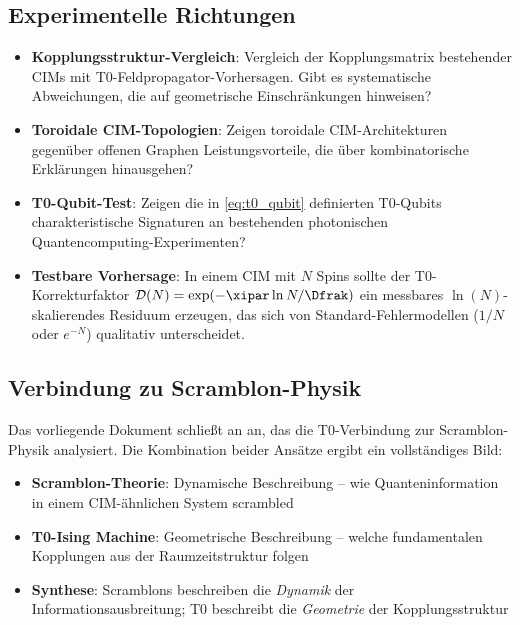\subsection{Experimentelle Richtungen}

\begin{itemize}
    \item \textbf{Kopplungsstruktur-Vergleich}: Vergleich der Kopplungsmatrix 
    bestehender CIMs mit T0-Feldpropagator-Vorhersagen. Gibt es systematische 
    Abweichungen, die auf geometrische Einschränkungen hinweisen?
    
    \item \textbf{Toroidale CIM-Topologien}: Zeigen toroidale CIM-Architekturen 
    gegenüber offenen Graphen Leistungsvorteile, die über kombinatorische 
    Erklärungen hinausgehen?
    
    \item \textbf{T0-Qubit-Test}: Zeigen die in \eqref{eq:t0_qubit} definierten 
    T0-Qubits charakteristische Signaturen an bestehenden photonischen 
    Quantencomputing-Experimenten?
    
    \item \textbf{Testbare Vorhersage}: In einem CIM mit $N$ Spins sollte der 
    T0-Korrekturfaktor $\mathcal{D}(N) = \exp(-\xipar \ln N / \Dfrak)$ ein 
    messbares $\ln(N)$-skalierendes Residuum erzeugen, das sich von 
    Standard-Fehlermodellen ($1/N$ oder $e^{-N}$) qualitativ unterscheidet.
\end{itemize}

\subsection{Verbindung zu Scramblon-Physik}

Das vorliegende Dokument schließt an \cite{pascher_scramblons_2026} an, das die 
T0-Verbindung zur Scramblon-Physik analysiert. Die Kombination beider Ansätze 
ergibt ein vollständiges Bild:

\begin{itemize}
    \item \textbf{Scramblon-Theorie}: Dynamische Beschreibung -- wie Quanteninformation 
    in einem CIM-ähnlichen System scrambled
    \item \textbf{T0-Ising Machine}: Geometrische Beschreibung -- welche fundamentalen 
    Kopplungen aus der Raumzeitstruktur folgen
    \item \textbf{Synthese}: Scramblons beschreiben die \emph{Dynamik} der 
    Informationsausbreitung; T0 beschreibt die \emph{Geometrie} der Kopplungsstruktur
\end{itemize}

